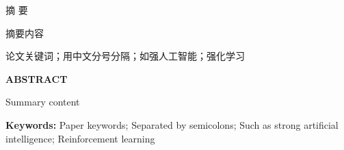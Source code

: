 
\thispagestyle{plain}
{}
\centerline{\heiti 摘 \quad 要}

\linespread{1.4} 

\bigskip

摘要内容

\bigskip

 论文关键词；用中文分号分隔；如强人工智能；强化学习

\clearpage{\pagestyle{empty}\cleardoublepage}

\newpage
\thispagestyle{plain}
{}
\centerline{\bfseries ABSTRACT}

\linespread{1.4}

\bigskip

Summary content

\bigskip

\noindent\textbf{ Keywords:} Paper keywords; Separated by semicolons; Such as strong artificial intelligence; Reinforcement learning

\clearpage{\pagestyle{empty}\cleardoublepage}


